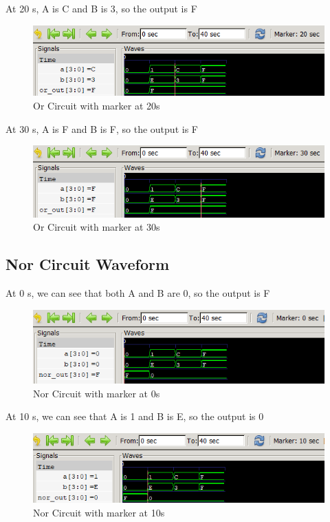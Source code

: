 \documentclass[12pt]{article}
\begin{document}
At 20 s, A is C and B is 3, so the output is F
\begin{figure}[h]
    \centering
    \includegraphics[width = 1.0\textwidth]{figs/Or20.png}
    \caption{Or Circuit with marker at 20s}
    \label{fig:enter-label}
\end{figure}

\newpage

At 30 s, A is F and B is F, so the output is F
\begin{figure}[h]
    \centering
    \includegraphics[width = 1.0\textwidth]{figs/Or30.png}
    \caption{Or Circuit with marker at 30s}
    \label{fig:enter-label}
\end{figure}


\subsection{Nor Circuit Waveform}

At 0 s, we can see that both A and B are 0, so the output is F
\begin{figure}[h]
    \centering
    \includegraphics[width = 1.0\textwidth]{figs/Nor0.png}
    \caption{Nor Circuit with marker at 0s}
    \label{fig:enter-label}
\end{figure}


At 10 s, we can see that A is 1 and B is E, so the output is 0
\begin{figure}[h]
    \centering
    \includegraphics[width = 1.0\textwidth]{figs/Nor10.png}
    \caption{Nor Circuit with marker at 10s}
    \label{fig:enter-label}
\end{figure}
\end{document}
